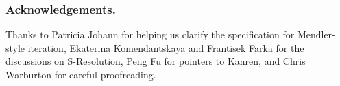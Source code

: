 \documentclass[runningheads,a4paper]{llncs}
\begin{document}
\subsubsection*{Acknowledgements.}
Thanks to Patricia Johann for helping us clarify the specification
for Mendler-style iteration, Ekaterina Komendantskaya and
Frantisek Farka for the discussions on S-Resolution,
Peng Fu for pointers to Kanren, and Chris Warburton for careful proofreading.
\makeatletter
\renewcommand\bibsection{\section*\bibname}
\makeatother



\end{document}
